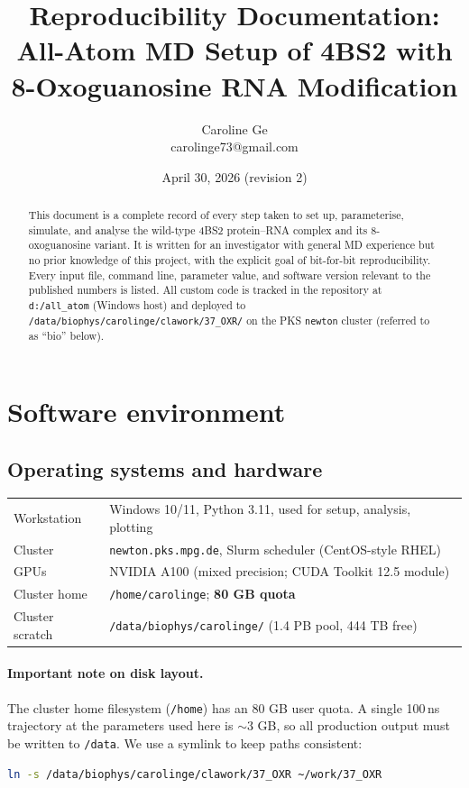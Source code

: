 \documentclass[11pt,a4paper]{article}
\title{Reproducibility Documentation:\\
\large All-Atom MD Setup of 4BS2 with 8-Oxoguanosine RNA Modification}
\author{Caroline Ge\\\small carolinge73@gmail.com}
\date{April 30, 2026 (revision 2)}
\begin{document}
\maketitle

\begin{abstract}
\noindent
This document is a complete record of every step taken to set up,
parameterise, simulate, and analyse the wild-type 4BS2 protein--RNA
complex and its 8-oxoguanosine variant. It is written for an
investigator with general MD experience but no prior knowledge of this
project, with the explicit goal of bit-for-bit reproducibility.
Every input file, command line, parameter value, and software version
relevant to the published numbers is listed. All custom code is
tracked in the repository at \texttt{d:/all\_atom} (Windows host) and
deployed to \texttt{/data/biophys/carolinge/clawork/37\_OXR/} on the
PKS \texttt{newton} cluster (referred to as ``bio'' below).
\end{abstract}

\tableofcontents
\vspace{1em}

\section{Software environment}
\label{sec:env}

\subsection{Operating systems and hardware}

\begin{tabular}{ll}
\toprule
Workstation              & Windows 10/11, Python 3.11, used for setup, analysis, plotting \\
Cluster                  & \texttt{newton.pks.mpg.de}, Slurm scheduler (CentOS-style RHEL) \\
GPUs                     & NVIDIA A100 (mixed precision; CUDA Toolkit 12.5 module) \\
Cluster home             & \texttt{/home/carolinge}; \textbf{80 GB quota} \\
Cluster scratch          & \texttt{/data/biophys/carolinge/} (1.4 PB pool, 444 TB free) \\
\bottomrule
\end{tabular}

\paragraph{Important note on disk layout.}
The cluster home filesystem (\texttt{/home}) has an 80 GB user quota.
A single 100\,ns trajectory at the parameters used here is $\sim$3 GB,
so all production output must be written to \texttt{/data}. We use a
symlink to keep paths consistent:
\begin{lstlisting}[language=bash]
ln -s /data/biophys/carolinge/clawork/37_OXR ~/work/37_OXR
\end{lstlisting}
\end{document}
